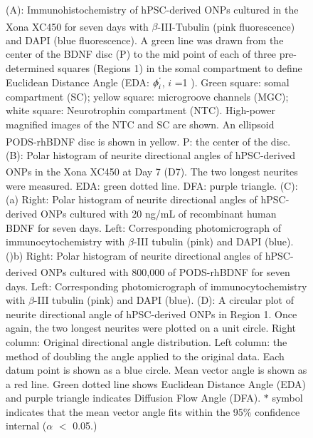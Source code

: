 \documentclass[review]{elsarticle}
\begin{document}
\begin{figure}
	\caption{(A): Immunohistochemistry of hPSC-derived ONPs cultured in the Xona\textsuperscript{\texttrademark} XC450 for seven days with $\beta$-III-Tubulin (pink fluorescence) and DAPI (blue fluorescence). A green line was drawn from the center of the BDNF disc (P) to the mid point of each of three pre-determined squares (Regions 1) in the somal compartment to define Euclidean Distance Angle (EDA: $\phi^{`}_{i}$, $i$ =1 ). Green square: somal compartment (SC); yellow square:  microgroove channels (MGC); white square: Neurotrophin compartment (NTC). High-power magnified images of the NTC and SC are shown. An ellipsoid PODS\textsuperscript{\textregistered}-rhBDNF disc is shown in yellow. P: the center of the disc.(B): Polar histogram of  neurite directional angles of hPSC-derived ONPs in the Xona\textsuperscript{\texttrademark} XC450 at Day 7 (D7). The two longest neurites were measured. EDA: green dotted line. DFA: purple triangle. (C): (a) Right: Polar histogram of neurite directional angles of hPSC-derived ONPs cultured with 20 ng/mL of recombinant human BDNF for seven days. Left: Corresponding photomicrograph of immunocytochemistry with $\beta$-III tubulin (pink) and DAPI (blue). ()b) Right: Polar histogram of neurite directional angles of hPSC-derived ONPs cultured with 800,000 of PODS\textsuperscript{\textregistered}-rhBDNF for seven days. Left: Corresponding photomicrograph of immunocytochemistry with $\beta$-III tubulin (pink) and DAPI (blue). (D):  A circular plot of neurite directional angle of hPSC-derived ONPs in Region 1. Once again, the two longest neurites were plotted on a unit circle. Right column: Original directional angle distribution. Left column: the method of doubling the angle applied to the original data. Each datum point is shown as a blue circle. Mean vector angle is shown as a red line. Green dotted line shows Euclidean Distance Angle (EDA) and purple triangle indicates Diffusion Flow Angle (DFA). $\ast$ symbol indicates that the mean vector angle fits within the 95\% confidence internal ($\alpha$ $<$ 0.05.)}
\end{figure}
\end{document}
